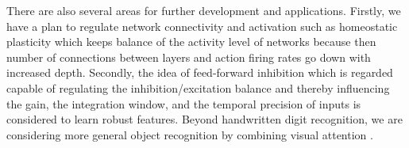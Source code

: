 \documentclass{article}
\begin{document}
There are also several areas for further development and applications.
Firstly, we have a plan to regulate network connectivity and activation  such as homeostatic plasticity \cite{Tien2018} which keeps balance of the activity level of networks because then number of connections between layers and action firing rates go down with increased depth. 
Secondly, the idea of feed-forward inhibition which is regarded capable of regulating the inhibition/excitation balance and thereby influencing the gain, the integration window, and the temporal precision of inputs \cite{DSouza2016} is considered to learn robust features. 
Beyond handwritten digit recognition, we are considering more general object recognition by combining visual attention \cite{Rea2013}.

%
%


\nocite{langley00}





%
%
%
\end{document}
